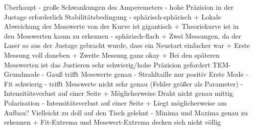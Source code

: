 Überhaupt
- große Schwankungen des Amperemeters
- hohe Präzision in der Justage erforderlich
Stabilitätsbedingung
- sphärisch-sphärisch
  + Lokale Abweichung der Messwerte von der Kurve ist gigantisch
  + Theoriekurve ist in den Messwerten kaum zu erkennen
- sphärisch-flach
  + Zwei Messungen, da der Laser so aus der Justage gebracht wurde, dass ein Neustart einfacher war
  + Erste Messung voll daneben
  + Zweite Messung ganz okay
  + Bei den späteren Messwerten ist das Justieren sehr schwierig/hohe Präzision gefordert
TEM-Grundmode
- Gauß trifft Messwerte genau
- Strahltaille nur positiv
Erste Mode
- Fit schwierig
- trifft Messwerte nicht sehr genau (Fehler größer als Parameter)
- Intensitätsverlust auf einer Seite
  + Möglicherweise Draht nicht genau mittig
Polarisation
- Intensitätsverlust auf einer Seite
  + Liegt möglicherweise am Aufbau? Vielleicht zu doll auf den Tisch gelehnt
- Minima und Maxima genau zu erkennen
  + Fit-Extrema und Messwert-Extrema decken sich nicht völlig
